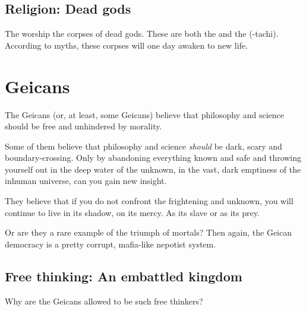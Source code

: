 \subsection{Religion: Dead gods}
\label{\Dragons{} worship dead gods}
The \dragons{} worship the corpses of dead gods. These are both the  and the \firstgendragons{} (\Tiamat-tachi). According to myths, these corpses will one day awaken to new life. 















\section{Geicans}
\label{Clan Geican}
\label{Geican}
\label{Geican philosophy}
The Geicans (or, at least, some Geicans) believe that philosophy and science should be free and unhindered by morality. 

Some of them believe that philosophy and science \emph{should} be dark, scary and boundary-crossing. Only by abandoning everything known and safe and throwing yourself out in the deep water of the unknown, in the vast, dark emptiness of the inhuman universe, can you gain new insight. 

They believe that if you do not confront the frightening and unknown, you will continue to live in its shadow, on its mercy. As its slave or as its prey. 

Or are they a rare example of the triumph of mortals? Then again, the Geican democracy is a pretty corrupt, mafia-like nepotist system.









\subsection{Free thinking: An embattled kingdom}
\label{Geica is embattled}
Why are the Geicans allowed to be such free thinkers? %


